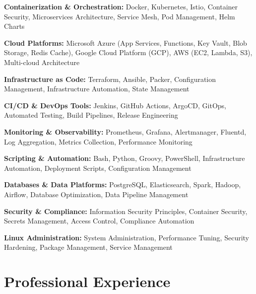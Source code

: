 \documentclass[letterpaper,10pt]{article}
\newenvironment{resume_list}{
  \vspace{-7pt}
  \begin{itemize}[itemsep=-2px, parsep=1pt, leftmargin=30pt]
}{
  \end{itemize}
}
\begin{document}
\begin{resume_list}
    \item \textbf{Containerization \& Orchestration:} Docker, Kubernetes, Istio, Container Security, Microservices Architecture, Service Mesh, Pod Management, Helm Charts
    \item \textbf{Cloud Platforms:} Microsoft Azure (App Services, Functions, Key Vault, Blob Storage, Redis Cache), Google Cloud Platform (GCP), AWS (EC2, Lambda, S3), Multi-cloud Architecture
    \item \textbf{Infrastructure as Code:} Terraform, Ansible, Packer, Configuration Management, Infrastructure Automation, State Management
    \item \textbf{CI/CD \& DevOps Tools:} Jenkins, GitHub Actions, ArgoCD, GitOps, Automated Testing, Build Pipelines, Release Engineering
    \item \textbf{Monitoring \& Observability:} Prometheus, Grafana, Alertmanager, Fluentd, Log Aggregation, Metrics Collection, Performance Monitoring
    \item \textbf{Scripting \& Automation:} Bash, Python, Groovy, PowerShell, Infrastructure Automation, Deployment Scripts, Configuration Management
    \item \textbf{Databases \& Data Platforms:} PostgreSQL, Elasticsearch, Spark, Hadoop, Airflow, Database Optimization, Data Pipeline Management
    \item \textbf{Security \& Compliance:} Information Security Principles, Container Security, Secrets Management, Access Control, Compliance Automation
    \item \textbf{Linux Administration:} System Administration, Performance Tuning, Security Hardening, Package Management, Service Management
\end{resume_list}

\section{Professional Experience}
\end{document}
